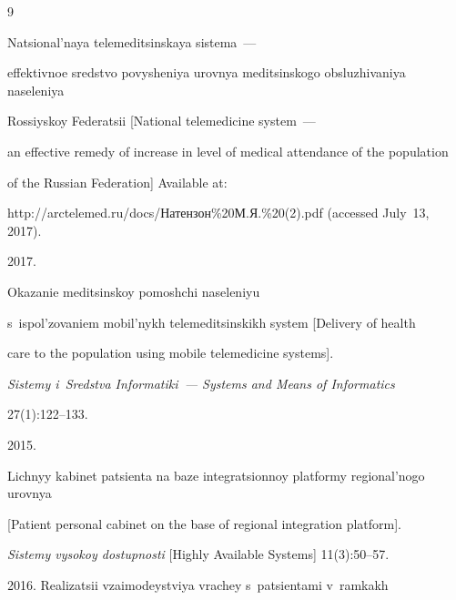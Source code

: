 {\small\frenchspacing


{%




\begin{thebibliography}{9}









Natsional'naya telemeditsinskaya sistema~--- 


effektivnoe sredstvo povysheniya urovnya meditsinskogo obsluzhivaniya naseleniya 


Rossiyskoy Fe\-de\-ra\-tsii [National telemedicine system~--- 


an effective remedy of increase in level of medical attendance of the population 


of the Russian Federation] Available at:  


{\sf http://arctelemed.ru/docs/Натензон\%20М.Я.\%20(2).pdf} (accessed July~13, 2017).




 2017. 


Okazanie meditsinskoy pomoshchi naseleniyu 


s~ispol'zovaniem mobil'nykh telemeditsinskikh system [Delivery of health 


care to the population using mobile telemedicine systems]. 


\textit{Sistemy i~Sredstva Informatiki~---  Systems and Means of Informatics}


27(1):122--133.




 2015. 


Lichnyy kabinet patsienta na baze integratsionnoy platformy regional'nogo urovnya 


[Patient personal cabinet on the base of regional integration platform]. 


\textit{Sistemy vysokoy dostupnosti} [Highly Available Systems] 11(3):50--57.









2016.  Realizatsii vzaimodeystviya vrachey s~patsientami v~ramkakh 



\end{thebibliography}}}
